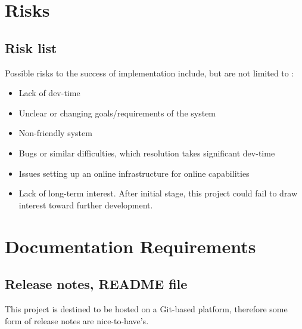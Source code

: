 \documentclass[11pt]{article}
\begin{document}
\vspace{10mm}
\section{Risks}

\subsection{Risk list}

Possible risks to the success of implementation include, but are not limited to :
\begin{itemize}
	\item Lack of dev-time
	\item Unclear or changing goals/requirements of the system
	\item Non-friendly system
	\item Bugs or similar difficulties, which resolution takes significant dev-time
	\item Issues setting up an online infrastructure for online capabilities
	\item Lack of long-term interest. After initial stage, this project could fail to draw interest toward further development.
\end{itemize}

















\newpage 
\section{Documentation Requirements}

\subsection{Release notes, README file}

This project is destined to be hosted on a Git-based platform, therefore some form of release notes are nice-to-have's.
\end{document}
